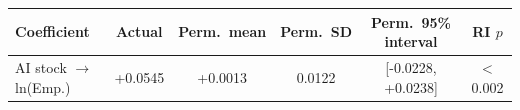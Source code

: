 \begin{tabular}{lccccc}
\toprule
Coefficient & Actual & Perm.\ mean & Perm.\ SD & Perm.\ 95\% interval & RI $p$ \\
\midrule
AI stock $\to$ ln(Emp.) & +0.0545 & +0.0013 & 0.0122 & [-0.0228, +0.0238] & $<$0.002 \\
\bottomrule
\end{tabular}